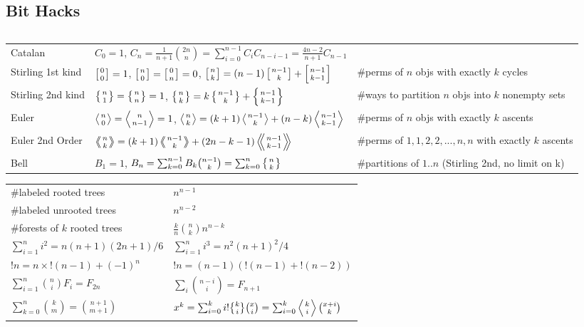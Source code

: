 \documentclass[8pt,a4paper,landscape,oneside]{amsart}
\newcommand{\code}[1]{\inputminted[fontsize=\normalsize,baselinestretch=1]{cpp}{_code/#1}}
\DeclareRobustCommand{\stirling}{\genfrac\{\}{0pt}{}}
\begin{document}
\begin{multicols*}{3}
    \subsection{Bit Hacks}
        \code{tricks/snoob.cpp}
        \newpage
    \begin{tabular}{@{}l|l|l@{}}
    \toprule
    Catalan	&	$C_0=1$, $C_n=\frac{1}{n+1}\binom{2n}{n} = \sum_{i=0}^{n-1}C_iC_{n-i-1} = \frac{4n-2}{n+1}C_{n-1}$  & \\
    Stirling 1st kind & $\left[{0\atop 0}\right]=1$, $\left[{n\atop 0}\right]=\left[{0\atop n}\right]=0$, $\left[{n\atop k}\right]=(n-1)\left[{n-1\atop k}\right]+\left[{n-1\atop k-1}\right]$ & \#perms of $n$ objs with exactly $k$ cycles\\
    Stirling 2nd kind & $\left\{{n\atop 1}\right\}=\left\{{n\atop n}\right\}=1$, $\left\{{n\atop k}\right\} = k \left\{{ n-1 \atop k }\right\} + \left\{{n-1\atop k-1}\right\}$ & \#ways to partition $n$ objs into $k$ nonempty sets\\
    Euler	& $\left \langle {n\atop 0} \right \rangle = \left \langle {n\atop n-1} \right \rangle = 1 $, $\left \langle {n\atop k} \right \rangle = (k+1) \left \langle {n-1\atop {k}} \right \rangle + (n-k)\left \langle {{n-1}\atop {k-1}} \right \rangle$ & \#perms of $n$ objs with exactly $k$ ascents \\
    Euler 2nd Order &  $\left \langle \!\!\left \langle {n\atop k} \right \rangle \!\! \right \rangle = (k+1) \left \langle \!\! \left \langle {{n-1}\atop {k}} \right \rangle \!\! \right \rangle +(2n-k-1)\left \langle \!\! \left \langle {{n-1}\atop {k-1}} \right \rangle  \!\! \right \rangle$ & \#perms of ${1,1,2,2,...,n,n}$ with exactly $k$ ascents \\
    Bell & $B_1 = 1$, $B_n = \sum_{k=0}^{n-1} B_k \binom{n-1}{k} = \sum_{k=0}^n\left\{{n\atop k}\right\}$ & \#partitions of $1..n$ (Stirling 2nd, no limit on k)\\
    \bottomrule
    \end{tabular}

    \vspace{10pt}
    \begin{tabular}{ll}
        \#labeled rooted trees & $n^{n-1}$ \\
        \#labeled unrooted trees & $n^{n-2}$ \\
        \#forests of $k$ rooted trees & $\frac{k}{n}\binom{n}{k}n^{n-k}$ \\
        $\sum_{i=1}^n i^2 = n(n+1)(2n+1)/6$ & $\sum_{i=1}^n i^3 = n^2(n+1)^2/4$ \\
        $!n = n\times!(n-1)+(-1)^n$ & $!n = (n-1)(!(n-1)+!(n-2))$ \\
        $\sum_{i=1}^n \binom{n}{i} F_i = F_{2n}$ & $\sum_{i} \binom{n-i}{i} = F_{n+1}$ \\
        $\sum_{k=0}^n \binom{k}{m} = \binom{n+1}{m+1}$ & $x^k = \sum_{i=0}^k i!\stirling{k}{i}\binom{x}{i} = \sum_{i=0}^k \left\langle {k \atop i} \right\rangle\binom{x+i}{k}$ \\


\end{tabular}
\end{multicols*}
\end{document}
